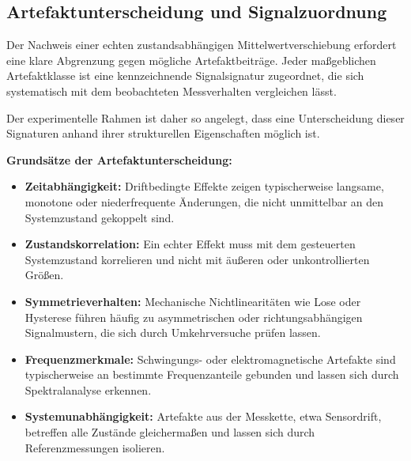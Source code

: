 \documentclass[12pt,a4paper]{report}
\begin{document}
\clearpage

\subsection{Artefaktunterscheidung und Signalzuordnung}

Der Nachweis einer echten zustandsabhängigen Mittelwertverschiebung
erfordert eine klare Abgrenzung gegen mögliche Artefaktbeiträge. Jeder
maßgeblichen Artefaktklasse ist eine kennzeichnende Signalsignatur
zugeordnet, die sich systematisch mit dem beobachteten Messverhalten
vergleichen lässt.

Der experimentelle Rahmen ist daher so angelegt, dass eine Unterscheidung
dieser Signaturen anhand ihrer strukturellen Eigenschaften möglich ist.

\vspace{0.5em}

\textbf{Grundsätze der Artefaktunterscheidung:}

\begin{itemize}
    \item \textbf{Zeitabhängigkeit:}
    Driftbedingte Effekte zeigen typischerweise langsame, monotone oder
    niederfrequente Änderungen, die nicht unmittelbar an den
    Systemzustand gekoppelt sind.

    \item \textbf{Zustandskorrelation:}
    Ein echter Effekt muss mit dem gesteuerten Systemzustand korrelieren
    und nicht mit äußeren oder unkontrollierten Größen.

    \item \textbf{Symmetrieverhalten:}
    Mechanische Nichtlinearitäten wie Lose oder Hysterese führen häufig
    zu asymmetrischen oder richtungsabhängigen Signalmustern, die sich
    durch Umkehrversuche prüfen lassen.

    \item \textbf{Frequenzmerkmale:}
    Schwingungs- oder elektromagnetische Artefakte sind typischerweise
    an bestimmte Frequenzanteile gebunden und lassen sich durch
    Spektralanalyse erkennen.

    \item \textbf{Systemunabhängigkeit:}
    Artefakte aus der Messkette, etwa Sensordrift, betreffen alle
    Zustände gleichermaßen und lassen sich durch Referenzmessungen
    isolieren.
\end{itemize}

\vspace{0.5em}
\end{document}

